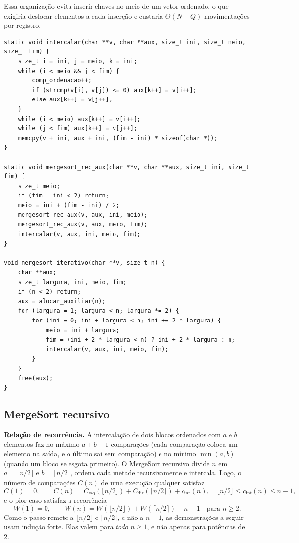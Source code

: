 \documentclass[11pt,a4paper]{article}
\begin{document}
Essa organização evita inserir chaves no meio de um vetor ordenado, o que exigiria deslocar elementos a cada inserção e custaria $\Theta(N+Q)$ movimentações por registro.

\begin{lstlisting}[caption={Intercalação estável e MergeSort recursivo e iterativo}]
static void intercalar(char **v, char **aux, size_t ini, size_t meio, size_t fim) {
    size_t i = ini, j = meio, k = ini;
    while (i < meio && j < fim) {
        comp_ordenacao++;
        if (strcmp(v[i], v[j]) <= 0) aux[k++] = v[i++];
        else aux[k++] = v[j++];
    }
    while (i < meio) aux[k++] = v[i++];
    while (j < fim) aux[k++] = v[j++];
    memcpy(v + ini, aux + ini, (fim - ini) * sizeof(char *));
}

static void mergesort_rec_aux(char **v, char **aux, size_t ini, size_t fim) {
    size_t meio;
    if (fim - ini < 2) return;
    meio = ini + (fim - ini) / 2;
    mergesort_rec_aux(v, aux, ini, meio);
    mergesort_rec_aux(v, aux, meio, fim);
    intercalar(v, aux, ini, meio, fim);
}

void mergesort_iterativo(char **v, size_t n) {
    char **aux;
    size_t largura, ini, meio, fim;
    if (n < 2) return;
    aux = alocar_auxiliar(n);
    for (largura = 1; largura < n; largura *= 2) {
        for (ini = 0; ini + largura < n; ini += 2 * largura) {
            meio = ini + largura;
            fim = (ini + 2 * largura < n) ? ini + 2 * largura : n;
            intercalar(v, aux, ini, meio, fim);
        }
    }
    free(aux);
}
\end{lstlisting}

\subsection{MergeSort recursivo}

\textbf{Relação de recorrência.} A intercalação de dois blocos ordenados com $a$ e $b$ elementos faz no máximo $a+b-1$ comparações (cada comparação coloca um elemento na saída, e o último sai sem comparação) e no mínimo $\min(a,b)$ (quando um bloco se esgota primeiro). O MergeSort recursivo divide $n$ em $a=\lfloor n/2\rfloor$ e $b=\lceil n/2\rceil$, ordena cada metade recursivamente e intercala. Logo, o número de comparações $C(n)$ de uma execução qualquer satisfaz
\begin{equation}
C(1)=0,\qquad C(n)=C_{\text{esq}}(\lfloor n/2\rfloor)+C_{\text{dir}}(\lceil n/2\rceil)+c_{\text{int}}(n),\quad \lfloor n/2\rfloor\le c_{\text{int}}(n)\le n-1,
\label{eq:recms}
\end{equation}
e o pior caso satisfaz a recorrência
\begin{equation}
W(1)=0,\qquad W(n)=W(\lfloor n/2\rfloor)+W(\lceil n/2\rceil)+n-1\quad\text{para }n\ge2.
\label{eq:recW}
\end{equation}
Como o passo remete a $\lfloor n/2\rfloor$ e $\lceil n/2\rceil$, e não a $n-1$, as demonstrações a seguir usam indução forte. Elas valem para \emph{todo} $n\ge1$, e não apenas para potências de 2.
\end{document}
